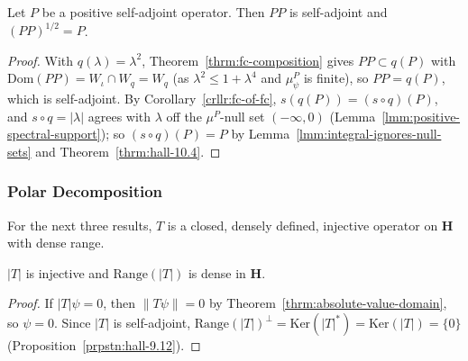 \begin{lemma}
    \label{lmm:positive-square-root-unique}
    \leanok
    Let $P$ be a positive self-adjoint operator. Then $PP$ is self-adjoint and $(PP)^{1/2} = P$.
\end{lemma}
\begin{proof}
    \leanok
    With $q(\lambda) = \lambda^2$, Theorem~\ref{thrm:fc-composition} gives $PP \subset q(P)$ with $\text{Dom}(PP) = W_\iota \cap W_q = W_q$ (as $\lambda^2 \le 1 + \lambda^4$ and $\mu^P_\psi$ is finite), so $PP = q(P)$, which is self-adjoint. By Corollary~\ref{crllr:fc-of-fc}, $s(q(P)) = (s \circ q)(P)$, and $s \circ q = |\lambda|$ agrees with $\lambda$ off the $\mu^P$-null set $(-\infty, 0)$ (Lemma~\ref{lmm:positive-spectral-support}); so $(s \circ q)(P) = P$ by Lemma~\ref{lmm:integral-ignores-null-sets} and Theorem~\ref{thrm:hall-10.4}.
\end{proof}

\subsubsection{Polar Decomposition}

For the next three results, $T$ is a closed, densely defined, injective operator on $\mathbf{H}$ with dense range.

\begin{lemma}
    \label{lmm:absolute-value-injective-dense-range}
    \leanok
    $|T|$ is injective and $\text{Range}(|T|)$ is dense in $\mathbf{H}$.
\end{lemma}
\begin{proof}
    \leanok
    If $|T|\psi = 0$, then $\|T\psi\| = 0$ by Theorem~\ref{thrm:absolute-value-domain}, so $\psi = 0$. Since $|T|$ is self-adjoint, $\text{Range}(|T|)^\perp = \text{Ker}(|T|^*) = \text{Ker}(|T|) = \{0\}$ (Proposition~\ref{prpstn:hall-9.12}).
\end{proof}

